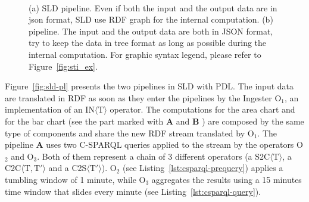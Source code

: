 \begin{figure}[t]
\centering
{} \\
\caption{(a) SLD pipeline. Even if both the input and the output data are in json format, SLD use RDF graph for the internal computation.
(b) \sti{} pipeline. The input and the output data are both in JSON format, \sti{} try to keep the data in tree format as long as possible during the internal computation.
For graphic syntax legend, please refer to Figure~\ref{fig:sti_ex}.}
\end{figure}

Figure~\ref{fig:sld-pl} presents the two pipelines in SLD with PDL.
The input data are translated in RDF as soon as they enter the pipelines by the \textsf{Ingester} O$_1$, an implementation of an IN$\langle\mathrm{T}\rangle$ operator. The computations for the area chart and for the bar chart (see the part marked with \textbf{A} and \textbf{B} ) are composed by the same type of components and share the new RDF stream translated by O$_1$.
The pipeline \textbf{A} uses two C-SPARQL queries applied to the stream by the operators O$_2$ and O$_3$. Both of them represent a chain of 3 different \river{} operators (a S2C$\langle\mathrm{T}\rangle$, a C2C$\langle\mathrm{T},\mathrm{T}'\rangle$ and a C2S$\langle\mathrm{T}'\rangle$). 
O$_2$ (see Listing~\ref{lst:csparql-prequery}) applies a tumbling window of 1 minute, while O$_3$ aggregates the results using a 15 minutes time window that slides every minute (see Listing~\ref{lst:csparql-query}). 

